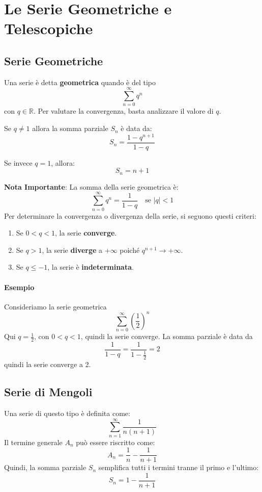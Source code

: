 \documentclass[12pt]{article}
\begin{document}
\section*{\LARGE Le Serie Geometriche e Telescopiche}

\subsection*{\large Serie Geometriche}

Una serie è detta \textbf{geometrica} quando è del tipo
\[
\sum_{n=0}^\infty q^n
\]
con $q \in \mathbb{R}$. Per valutare la convergenza, basta analizzare il valore di $q$.

Se $q \neq 1$ allora la somma parziale $S_n$ è data da:
\[
S_n = \frac{1 - q^{n+1}}{1 - q}
\]

Se invece $q = 1$, allora:
\[
S_n = n + 1
\]

\textbf{Nota Importante}: La somma della serie geometrica è:
\[
\sum_{n=0}^\infty q^n = \frac{1}{1 - q} \quad \text{se } |q| < 1
\]
Per determinare la convergenza o divergenza della serie, si seguono questi criteri:

\begin{enumerate}
    \item Se $0 < q < 1$, la serie \textbf{converge}.
    \item Se $q > 1$, la serie \textbf{diverge} a $+\infty$ poiché $q^{n+1} \to +\infty$.
    \item Se $q \leq -1$, la serie è \textbf{indeterminata}.
\end{enumerate}

\paragraph{Esempio}

Consideriamo la serie geometrica
\[
\sum_{n=0}^\infty \left(\frac{1}{2}\right)^n
\]
Qui $q = \frac{1}{2}$, con $0 < q < 1$, quindi la serie converge. La somma parziale è data da
\[
\frac{1}{1 - q} = \frac{1}{1 - \frac{1}{2}} = 2
\]
quindi la serie converge a 2.

\subsection*{\large Serie di Mengoli}

Una serie di questo tipo è definita come:
\[
\sum_{n=1}^\infty \frac{1}{n(n+1)}
\]
Il termine generale $A_n$ può essere riscritto come:
\[
A_n = \frac{1}{n} - \frac{1}{n + 1}
\]
Quindi, la somma parziale $S_n$ semplifica tutti i termini tranne il primo e l'ultimo:
\[
S_n = 1 - \frac{1}{n + 1}
\]
\end{document}
